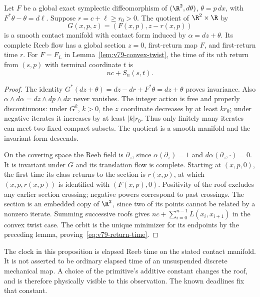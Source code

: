 \begin{proposition}
\label{prop:v79-contact}
Let $F$ be a global exact symplectic diffeomorphism of $(\R^2,d\theta)$,
$\theta=p\,dx$, with $F^*\theta-\theta=d\ell$.  Suppose
$r=c+\ell\ge r_0>0$.  The quotient of $\R^2\times\R$ by
\begin{equation}\label{eq:v79-contact-deck}
       G(x,p,z)=(F(x,p),z-r(x,p))
\end{equation}
is a smooth contact manifold with contact form induced by
$\alpha=dz+\theta$.  Its complete Reeb flow has a global section
$z=0$, first-return map $F$, and first-return time $r$.
For $F=F_L$ in Lemma~\ref{lem:v79-convex-twist}, the time of its
$n$th return from $(s,p)$ with terminal coordinate $t$ is
\begin{equation}\label{eq:v79-return-time}
                            nc+S_n(s,t).
\end{equation}
\end{proposition}
\begin{proof}
The identity $G^*(dz+\theta)=dz-dr+F^*\theta=dz+\theta$ proves
invariance.  Also $\alpha\wedge d\alpha=dz\wedge dp\wedge dx$
never vanishes.  The integer action is free and properly discontinuous:
under $G^k$, $k>0$, the $z$ coordinate decreases by at least $kr_0$;
under negative iterates it increases by at least $|k|r_0$.  Thus only
finitely many iterates can meet two fixed compact subsets.  The quotient
is a smooth manifold and the invariant form descends.

On the covering space the Reeb field is $\partial_z$, since
$\alpha(\partial_z)=1$ and $d\alpha(\partial_z,\cdot)=0$.
It is invariant under $G$ and its translation flow is complete.
Starting at $(x,p,0)$, the first time its class returns to the section
is $r(x,p)$, at which
$(x,p,r(x,p))$ is identified with $(F(x,p),0)$.  Positivity of the
roof excludes any earlier section crossing; negative powers correspond
to past crossings.  The section is an embedded copy of $\R^2$, since
two of its points cannot be related by a nonzero iterate.
Summing successive roofs gives
$nc+\sum_{i=0}^{n-1}L(x_i,x_{i+1})$ in the convex twist case.
The orbit is the unique minimizer for its endpoints by the preceding
lemma, proving~\eqref{eq:v79-return-time}.
\end{proof}

The clock in this proposition is elapsed Reeb time on the stated
contact manifold.  It is not asserted to be ordinary elapsed time of
an unsuspended discrete mechanical map.  A choice of the primitive's
additive constant changes the roof, and is therefore physically visible
to this observation.  The known deadlines fix that constant.


